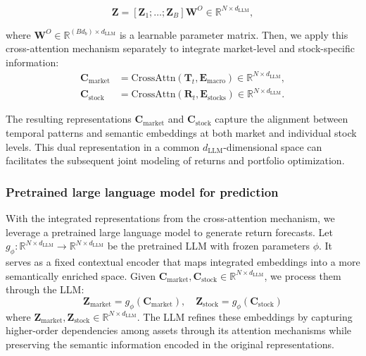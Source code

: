 \begin{equation}
    \mathbf{Z} = [\mathbf{Z}_1;\ldots;\mathbf{Z}_B]\mathbf{W}^O \in \mathbb{R}^{N \times d_{\text{LLM}}},
\end{equation}

where $\mathbf{W}^O \in \mathbb{R}^{(B d_b) \times d_{\text{LLM}}}$ is a learnable parameter matrix. Then, we apply this cross-attention mechanism separately to integrate market-level and stock-specific information: 
\begin{equation}
\begin{aligned}
    \mathbf{C}_{\text{market}} &= \text{CrossAttn}(\mathbf{T}_t, \mathbf{E}_{\text{macro}}) \in \mathbb{R}^{N \times d_{\text{LLM}}}, \\
    \mathbf{C}_{\text{stock}} &= \text{CrossAttn}(\mathbf{R}_t, \mathbf{E}_{\text{stocks}}) \in \mathbb{R}^{N \times d_{\text{LLM}}}.
\end{aligned}
\end{equation}

The resulting representations $\mathbf{C}_{\text{market}}$ and $\mathbf{C}_{\text{stock}}$ capture the alignment between temporal patterns and semantic embeddings at both market and individual stock levels. This dual representation in a common $d_{\text{LLM}}$-dimensional space can facilitates the subsequent joint modeling of returns and portfolio optimization.

\subsubsection{Pretrained large language model for prediction} With the integrated representations from the cross-attention mechanism, we leverage a pretrained large language model to generate return forecasts. Let $g_{\phi}: \mathbb{R}^{N \times d_{\text{LLM}}} \to \mathbb{R}^{N \times d_{\text{LLM}}}$ be the pretrained LLM with frozen parameters $\phi$. It serves as a fixed contextual encoder that maps integrated embeddings into a more semantically enriched space.
Given $\mathbf{C}_{\text{market}}, \mathbf{C}_{\text{stock}} \in \mathbb{R}^{N \times d_{\text{LLM}}}$, we process them through the LLM:
\begin{equation}
\mathbf{Z}_{\text{market}} = g_{\phi}(\mathbf{C}_{\text{market}}), \quad
\mathbf{Z}_{\text{stock}} = g_{\phi}(\mathbf{C}_{\text{stock}})
\end{equation}
where $\mathbf{Z}_{\text{market}}, \mathbf{Z}_{\text{stock}} \in \mathbb{R}^{N \times d_{\text{LLM}}}$. The LLM refines these embeddings by capturing higher-order dependencies among assets through its attention mechanisms while preserving the semantic information encoded in the original representations.

